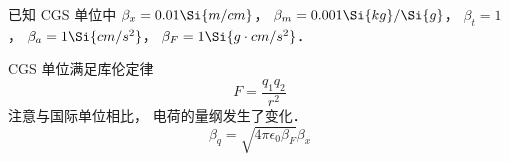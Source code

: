 
\begin{issues}
\issueDraft
\end{issues}


已知 CGS 单位中 $\beta_x = 0.01\Si{m/cm}$， $\beta_m = 0.001\Si{kg}/\Si{g}$， $\beta_t = 1$， $\beta_a = 1\Si{cm/s^2}$， $\beta_F = 1\Si{g \cdot cm/s^2}$．

CGS 单位满足库伦定律
\begin{equation}
F = \frac{q_1 q_2}{r^2}
\end{equation}
注意与国际单位相比， 电荷的量纲发生了变化．
\begin{equation}
\beta_q = \sqrt{4\pi\epsilon_0\beta_F} \beta_x
\end{equation}

